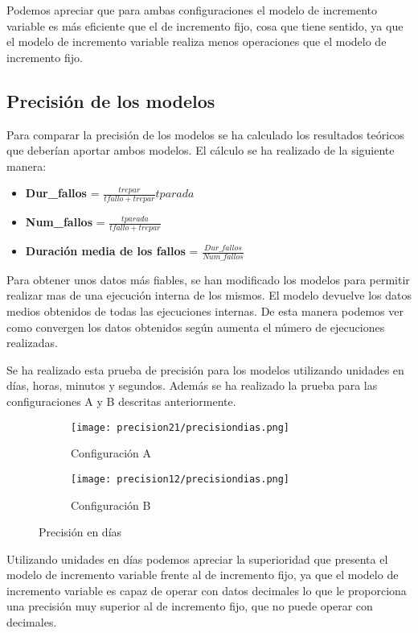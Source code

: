 Podemos apreciar que para ambas configuraciones el modelo de incremento variable es más eficiente que el de incremento fijo, cosa que tiene sentido, ya que el modelo de incremento variable realiza menos operaciones que el modelo de incremento fijo.

\newpage

\subsection{Precisión de los modelos}
Para comparar la precisión de los modelos se ha calculado los resultados teóricos que deberían aportar ambos modelos. El cálculo se ha realizado de la siguiente manera:
\begin{itemize}
	\item \textbf{Dur\_fallos} = $ \frac{trepar}{tfallo + trepar}tparada  $
	\item \textbf{Num\_fallos} = $ \frac{tparada}{tfallo + trepar}  $
	\item \textbf{Duración media de los fallos} = $\frac{Dur\_fallos}{Num\_fallos}$
\end{itemize}

Para obtener unos datos más fiables, se han modificado los modelos para permitir realizar mas de una ejecución interna de los mismos. El modelo devuelve los datos medios obtenidos de todas las ejecuciones internas. De esta manera podemos ver como convergen los datos obtenidos según aumenta el número de ejecuciones realizadas.

Se ha realizado esta prueba de precisión para los modelos utilizando unidades en días, horas, minutos y segundos. Además se ha realizado la prueba para las configuraciones A y B descritas anteriormente.

\begin{figure}[H]
	\centering
	\begin{subfigure}[b]{0.8\textwidth}
		\centering
		\texttt{[image: precision21/precisiondias.png]}
		\caption{Configuración A}
	\end{subfigure}
	\hfill
	\begin{subfigure}[b]{0.8\textwidth}
		\centering
		\texttt{[image: precision12/precisiondias.png]}
		\caption{Configuración B}
	\end{subfigure}
	\caption{Precisión en días}
\end{figure}

Utilizando unidades en días podemos apreciar la superioridad que presenta el modelo de incremento variable frente al de incremento fijo, ya que el modelo de incremento variable es capaz de operar con datos decimales lo que le proporciona una precisión muy superior al de incremento fijo, que no puede operar con decimales.


